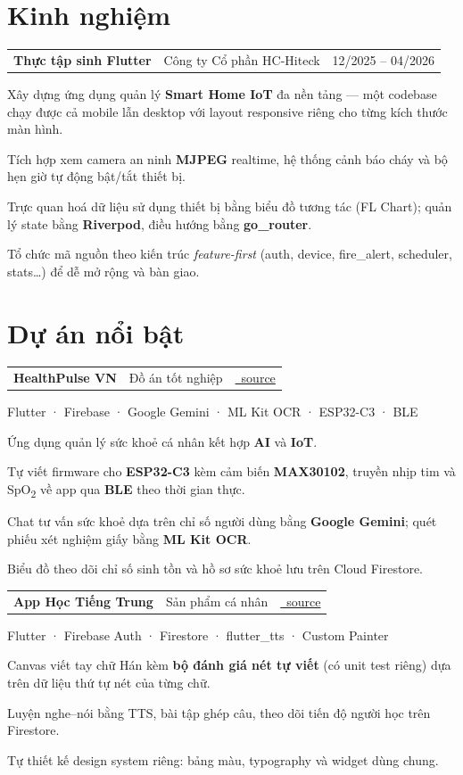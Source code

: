 \documentclass[11pt,a4paper]{article}
\makeatletter
\newcommand{\icoGit}{\faGithub~}
\newcommand{\icoGit}{}
\newcommand{\role}[3]{%
  \vspace{5pt}\par
  \begin{tabularx}{\linewidth}{@{}X r@{}}
    \textbf{#1}\ \textcolor{muted}{\textbar}\ #2 & \textcolor{muted}{\small #3}
  \end{tabularx}\par
  \vspace{2pt}%
}
\newcommand{\project}[4]{%
  \vspace{6pt}\par
  \begin{tabularx}{\linewidth}{@{}X r@{}}
    \textbf{#1}\ \textcolor{muted}{\textbar}\ \textcolor{muted}{\small #2}
    & \href{#3}{\icoGit\ttfamily\footnotesize source}
  \end{tabularx}\par
  {\footnotesize\color{accent}#4\par}%
  \vspace{2pt}%
}
\makeatother
\begin{document}
\section{Kinh nghiệm}

\role{Thực tập sinh Flutter}{Công ty Cổ phần HC-Hiteck}{12/2025 -- 04/2026}
\begin{pts}
  \item Xây dựng ứng dụng quản lý \textbf{Smart Home IoT} đa nền tảng --- một codebase chạy
        được cả mobile lẫn desktop với layout responsive riêng cho từng kích thước màn hình.
  \item Tích hợp xem camera an ninh \textbf{MJPEG} realtime, hệ thống cảnh báo cháy và
        bộ hẹn giờ tự động bật/tắt thiết bị.
  \item Trực quan hoá dữ liệu sử dụng thiết bị bằng biểu đồ tương tác (FL Chart);
        quản lý state bằng \textbf{Riverpod}, điều hướng bằng \textbf{go\_router}.
  \item Tổ chức mã nguồn theo kiến trúc \textit{feature-first} (auth, device, fire\_alert,
        scheduler, stats\ldots) để dễ mở rộng và bàn giao.
\end{pts}

\section{Dự án nổi bật}

\project{HealthPulse VN}{Đồ án tốt nghiệp}{https://github.com/Hdoanf/doantotnghiep}%
{Flutter · Firebase · Google Gemini · ML Kit OCR · ESP32-C3 · BLE}
\begin{pts}
  \item Ứng dụng quản lý sức khoẻ cá nhân kết hợp \textbf{AI} và \textbf{IoT}.
  \item Tự viết firmware cho \textbf{ESP32-C3} kèm cảm biến \textbf{MAX30102}, truyền nhịp tim
        và SpO\textsubscript{2} về app qua \textbf{BLE} theo thời gian thực.
  \item Chat tư vấn sức khoẻ dựa trên chỉ số người dùng bằng \textbf{Google Gemini};
        quét phiếu xét nghiệm giấy bằng \textbf{ML Kit OCR}.
  \item Biểu đồ theo dõi chỉ số sinh tồn và hồ sơ sức khoẻ lưu trên Cloud Firestore.
\end{pts}

\project{App Học Tiếng Trung}{Sản phẩm cá nhân}{https://github.com/Hdoanf/apphoctiengtrung}%
{Flutter · Firebase Auth · Firestore · flutter\_tts · Custom Painter}
\begin{pts}
  \item Canvas viết tay chữ Hán kèm \textbf{bộ đánh giá nét tự viết} (có unit test riêng)
        dựa trên dữ liệu thứ tự nét của từng chữ.
  \item Luyện nghe--nói bằng TTS, bài tập ghép câu, theo dõi tiến độ người học trên Firestore.
  \item Tự thiết kế design system riêng: bảng màu, typography và widget dùng chung.
\end{pts}
\end{document}
